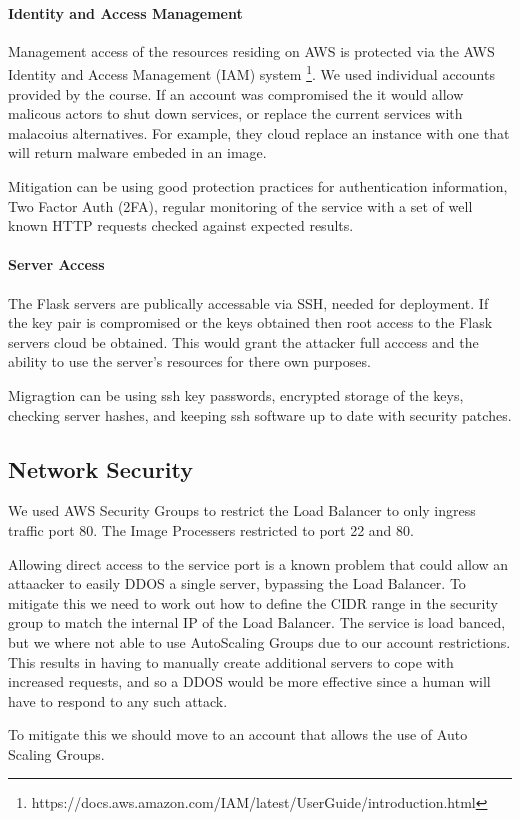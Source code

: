 \documentclass[conference]{IEEEtran}
\begin{document}
\paragraph{Identity and Access Management}
Management access of the resources residing on AWS is protected via the AWS Identity and Access Management (IAM) system \footnote{https://docs.aws.amazon.com/IAM/latest/UserGuide/introduction.html}. We used individual accounts provided by the course. If an account was compromised the it would allow malicous actors to shut down services, or replace the current services with malacoius alternatives. For example, they cloud replace an instance with one that will return malware embeded in an image. \par
Mitigation can be using good protection practices for authentication information, Two Factor Auth (2FA), regular monitoring of the service with a set of well known HTTP requests checked against expected results.
\paragraph{Server Access}
The Flask servers are publically accessable via SSH, needed for deployment. If the key pair is compromised or the keys obtained then root access to the Flask servers cloud be obtained. This would grant the attacker full acccess and the ability to use the server's resources for there own purposes. \par
Migragtion can be using ssh key passwords, encrypted storage of the keys, checking server hashes, and keeping ssh software up to date with security patches.
\subsection{Network Security}
We used AWS Security Groups to restrict the Load Balancer to only ingress traffic port 80. The Image Processers restricted to port 22 and 80. \par
Allowing direct access to the service port is a known problem that could allow an attaacker to easily DDOS a single server, bypassing the Load Balancer. To mitigate this we need to work out how to define the CIDR range in the security group to match the internal IP of the Load Balancer.
The service is load banced, but we where not able to use AutoScaling Groups due to our account restrictions. This results in having to manually create additional servers to cope with increased requests, and so a DDOS would be more effective since a human will have to respond to any such attack.\par
To mitigate this we should move to an account that allows the use of Auto Scaling Groups.  
\end{document}
